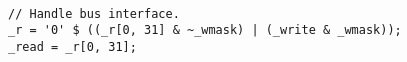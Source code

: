 \declaration{}
\implementation{}
\begin{lstlisting}

// Handle bus interface.
_r = '0' $ ((_r[0, 31] & ~_wmask) | (_write & _wmask));
_read = _r[0, 31];

\end{lstlisting}

